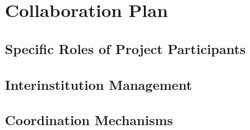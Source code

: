 \chapter{Collaboration Plan}
\thispagestyle{empty}

\section{Specific Roles of Project Participants}

\section{Interinstitution Management}

\section{Coordination Mechanisms}
